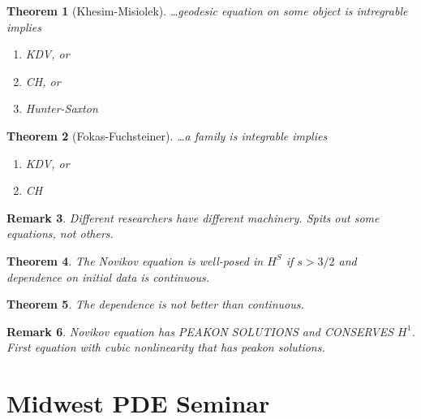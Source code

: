 \documentclass[12pt,reqno]{amsart}
\numberwithin{equation}{section}  %
\newtheorem{theorem}{Theorem}[section]
\newtheorem{remark}[theorem]{Remark}
\begin{document}
%
%
%                
%
%
%
%
\begin{theorem}[Khesim-Misiolek]
\ldots geodesic equation on some object is intregrable implies
\begin{enumerate}
 \item{ KDV, or}
 \item{ CH, or}
 \item{ Hunter-Saxton}
\end{enumerate}
%
\end{theorem}
%
%
%
%
%
%
%                
%
%
%
%
\begin{theorem}[Fokas-Fuchsteiner]
\ldots a family is integrable implies
\begin{enumerate}
\item{ KDV, or}
\item{ CH}
  \end{enumerate}
\end{theorem}
%
%
%
%
\begin{framed}
\begin{remark}
Different researchers have different machinery. Spits out some equations, not
others.
\end{remark}
\end{framed}
%
%
%
%
%
%
%                
%
%
%
%
\begin{theorem}
  The Novikov equation is well-posed in $H^{S}$ if $s > 3/2$ and dependence on
  initial data is continuous.
\end{theorem}
%
%
%
%
%
%
%                
%
%
%
%
\begin{theorem}
The dependence is not better than continuous.
\end{theorem}
%
%
%
%
\begin{framed}
%
%
\begin{remark}
  Novikov equation has PEAKON SOLUTIONS and CONSERVES $H^{1}$. First equation
  with cubic nonlinearity that has peakon solutions. 
\end{remark}
%
%
\end{framed}
%
%
%
%
%
%
%
%
%
%
\section{Midwest PDE Seminar} 
\label{sec:mpde}
\end{document}
